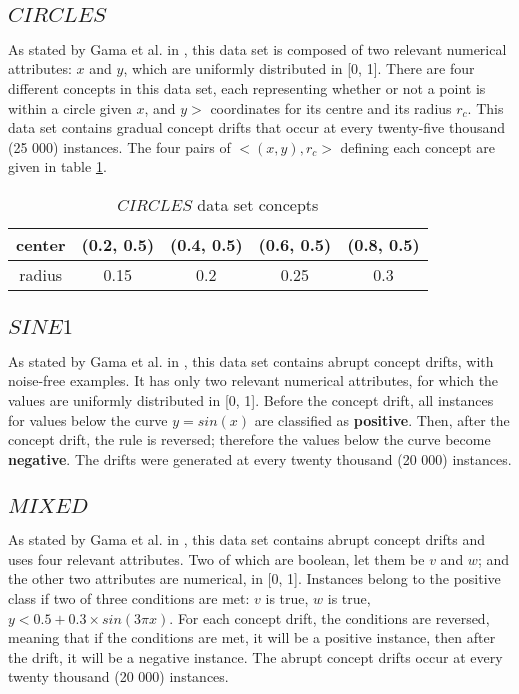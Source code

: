 \subsection{$CIRCLES$}
As stated by Gama et al. in \cite{gama2004learning}, this data set is composed of two relevant numerical attributes: $x$ and $y$, which are uniformly distributed in [0, 1]. There are four different concepts in this data set, each representing whether or not a point is within a circle given $x$, and $y>$ coordinates for its centre and its radius $r_c$. This data set contains gradual concept drifts that occur at every twenty-five thousand (25 000) instances. The four pairs of $<(x,y), r_c>$ defining each concept are given in table \ref{table:circle_concepts}.

\begin{table}[]
\centering
\caption{\label{table:circle_concepts}$CIRCLES$ data set concepts}
\begin{tabular}{|c|c|c|c|c|}
\hline
center & (0.2, 0.5) & (0.4, 0.5) & (0.6, 0.5) & (0.8, 0.5) \\ \hline
radius & 0.15       & 0.2        & 0.25       & 0.3        \\ \hline
\end{tabular}
\end{table}

\subsection{$SINE1$}
As stated by Gama et al. in \cite{gama2004learning}, this data set contains abrupt concept drifts, with noise-free examples. It has only two relevant numerical attributes, for which the values are uniformly distributed in [0, 1]. Before the concept drift, all instances for values below the curve $y = sin(x)$ are classified as \textbf{positive}. Then, after the concept drift, the rule is reversed; therefore the values below the curve become \textbf{negative}. The drifts were generated at every twenty thousand (20 000) instances.

\subsection{$MIXED$}
As stated by Gama et al. in \cite{gama2004learning}, this data set contains abrupt concept drifts and uses four relevant attributes. Two of which are boolean, let them be $v$ and $w$; and the other two attributes are numerical, in [0, 1]. Instances belong to the positive class if two of three conditions are met: $v$ is true, $w$ is true, $y < 0.5 + 0.3 \times sin(3\pi x)$. For each concept drift, the conditions are reversed, meaning that if the conditions are met, it will be a positive instance, then after the drift, it will be a negative instance. The abrupt concept drifts occur at every twenty thousand (20 000) instances.

